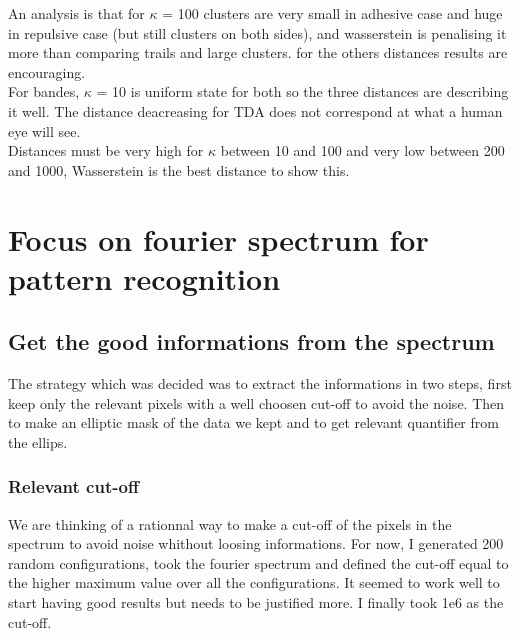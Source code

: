 \documentclass{article}
\begin{document}
An analysis is that for $\kappa$ = 100 clusters are very small in adhesive case and huge in repulsive case (but still clusters on both sides),
and wasserstein is penalising it more than comparing trails and large clusters. for the others distances results are encouraging.\\
For bandes, $\kappa$ = 10 is uniform state for both so the three distances are describing it well. The distance deacreasing for TDA does not correspond at what a human eye will see.\\
Distances must be very high for $\kappa$ between 10 and 100 and very low between 200 and 1000, Wasserstein is the best distance to show this.

\section{Focus on fourier spectrum for pattern recognition}
\subsection{Get the good informations from the spectrum}
The strategy which was decided was to extract the informations in two steps, first keep only the relevant pixels with a well choosen cut-off to avoid the noise.
Then to make an elliptic mask of the data we kept and to get relevant quantifier from the ellips.
\subsubsection{Relevant cut-off}
We are thinking of a rationnal way to make a cut-off of the pixels in the spectrum to avoid noise whithout loosing informations. For now,
I generated 200 random configurations, took the fourier spectrum and defined the cut-off equal to the higher maximum value over all the configurations.
It seemed to work well to start having good results but needs to be justified more.
I finally took 1e6 as the cut-off.
\end{document}
